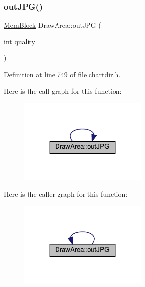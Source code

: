 \subsubsection{\texorpdfstring{out\+J\+P\+G()}{outJPG()}\hspace{0.1cm}{\footnotesize\ttfamily [3/3]}}
{\footnotesize\ttfamily \hyperlink{class_mem_block}{Mem\+Block} Draw\+Area\+::out\+J\+PG (\begin{DoxyParamCaption}\item[{int}]{quality = {} }\end{DoxyParamCaption})\hspace{0.3cm}{\ttfamily [inline]}}



Definition at line 749 of file chartdir.\+h.

Here is the call graph for this function\+:
\nopagebreak
\begin{figure}[H]
\begin{center}
\leavevmode
\includegraphics[width=179pt]{class_draw_area_a67d04710973c1e875c4679ad48236462_cgraph}
\end{center}
\end{figure}
Here is the caller graph for this function\+:
\nopagebreak
\begin{figure}[H]
\begin{center}
\leavevmode
\includegraphics[width=179pt]{class_draw_area_a67d04710973c1e875c4679ad48236462_icgraph}
\end{center}
\end{figure}
\mbox{\label{class_draw_area_a13885f1e2559a146b6a1d147503a5a63}} 
